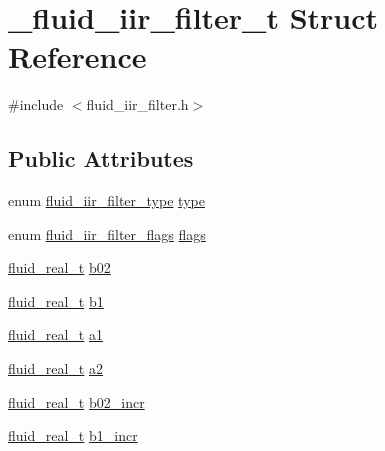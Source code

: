 \hypertarget{struct__fluid__iir__filter__t}{}\section{\+\_\+fluid\+\_\+iir\+\_\+filter\+\_\+t Struct Reference}
\label{struct__fluid__iir__filter__t}


{\ttfamily \#include $<$fluid\+\_\+iir\+\_\+filter.\+h$>$}

\subsection*{Public Attributes}
\begin{DoxyCompactItemize}
\item 
enum \hyperlink{synth_8h_a8a4cb4bd240d3654707ac0c5c7337a63}{fluid\+\_\+iir\+\_\+filter\+\_\+type} \hyperlink{struct__fluid__iir__filter__t_a651ef143533475852e123c05e8b7be1c}{type}
\item 
enum \hyperlink{synth_8h_a1e682c5d6f22e13947cc07bcd92d7525}{fluid\+\_\+iir\+\_\+filter\+\_\+flags} \hyperlink{struct__fluid__iir__filter__t_a272319b339db2f205d8b29fdba27877b}{flags}
\item 
\hyperlink{fluidsynth__priv_8h_a9e96f0917747b69cabb7c671bc693dbb}{fluid\+\_\+real\+\_\+t} \hyperlink{struct__fluid__iir__filter__t_aaba0627304b81d72f5a8160a4c1e0c6d}{b02}
\item 
\hyperlink{fluidsynth__priv_8h_a9e96f0917747b69cabb7c671bc693dbb}{fluid\+\_\+real\+\_\+t} \hyperlink{struct__fluid__iir__filter__t_aea2d3dea1a947f0764733eba68d509b0}{b1}
\item 
\hyperlink{fluidsynth__priv_8h_a9e96f0917747b69cabb7c671bc693dbb}{fluid\+\_\+real\+\_\+t} \hyperlink{struct__fluid__iir__filter__t_ad3f82ec6e5c739d343b06e4657dc1b04}{a1}
\item 
\hyperlink{fluidsynth__priv_8h_a9e96f0917747b69cabb7c671bc693dbb}{fluid\+\_\+real\+\_\+t} \hyperlink{struct__fluid__iir__filter__t_af607eff988c02048eba7b30a228397ca}{a2}
\item 
\hyperlink{fluidsynth__priv_8h_a9e96f0917747b69cabb7c671bc693dbb}{fluid\+\_\+real\+\_\+t} \hyperlink{struct__fluid__iir__filter__t_a72c4092eb203fe81e3c0f8348f04b1b4}{b02\+\_\+incr}
\item 
\hyperlink{fluidsynth__priv_8h_a9e96f0917747b69cabb7c671bc693dbb}{fluid\+\_\+real\+\_\+t} \hyperlink{struct__fluid__iir__filter__t_abc64713cbc233555e6aee28ff2e046e1}{b1\+\_\+incr}
\item 

\end{DoxyCompactItemize}
